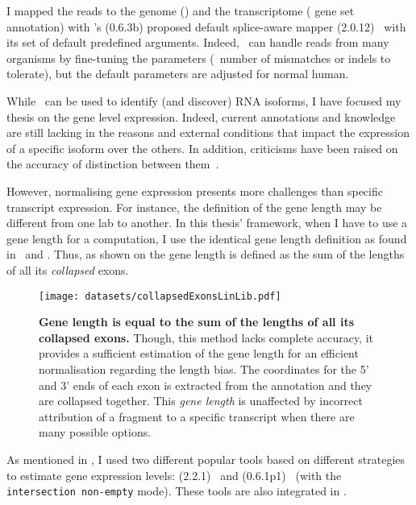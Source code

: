 I mapped the reads to the genome ()
and the transcriptome ( gene set annotation)
with \irap's (0.6.3b) proposed default splice-aware mapper
(2.0.12)~
with its set of default predefined arguments.
Indeed, \toph\ can handle reads from many organisms
by fine-tuning the parameters (\eg\ number of mismatches or indels to tolerate),
but the default parameters are adjusted for normal human.\mybr\

\label{minisec:quantNorm}
While \Rnaseq\ can be used to identify (and discover) \gls{RNA}
isoforms, I have focused my thesis on the gene level expression. Indeed, current
annotations and knowledge are still lacking in the reasons and
external conditions that impact the expression of a specific isoform over the
others. In addition, criticisms have been raised on the accuracy of distinction
between them~.\mybr\

However, normalising gene expression
presents more challenges than specific transcript expression.
For instance, the definition of the gene length may be different
from one lab to another.
In this thesis' framework,
when I have to use a gene length for a computation,
I use the identical gene length definition as found in
\irap\ and \egxa.
Thus, as shown on  the gene
length is defined as the sum of the lengths of all its \emph{collapsed} exons.\mybr\

\begin{figure}
    \texttt{[image: datasets/collapsedExonsLinLib.pdf]}\centering
        \caption[Gene length is equal to the sum of the lengths of all its collapsed
        exons]{\label{fig:Genelength-collapsedExons}\textbf{Gene length is equal
        to the sum of the lengths of all its collapsed exons.} Though,
        this method lacks  complete accuracy, it provides a sufficient estimation
        of the gene length for an efficient normalisation regarding the length bias.
        The coordinates for the 5' and 3' ends of each exon is extracted from
        the annotation and they are collapsed together. This \emph{gene length}
        is unaffected by incorrect attribution of a fragment to a
        specific transcript when there are many possible options.}
    \end{figure}

As mentioned in , I used two different popular tools based on
different strategies to estimate
gene expression levels:
(2.2.1)~
and 
(0.6.1p1)~ (with the \texttt{intersection non-empty} mode).
These tools are also integrated in \irap.\mybr\

